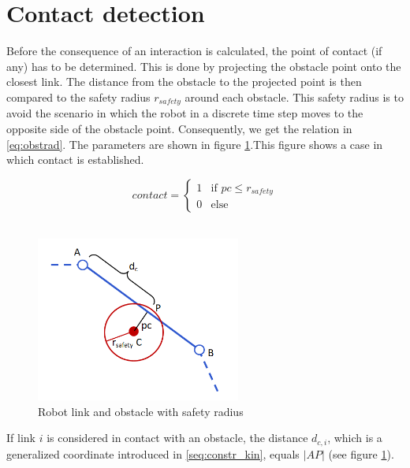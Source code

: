 \section{Contact detection}

Before the consequence of an interaction is calculated, the point of contact (if any) has to be determined. This is done by projecting the obstacle point onto the closest link. The distance from the obstacle to the projected point is then compared to the safety radius $r_{safety}$ around each obstacle. This safety radius is to avoid the scenario in which the robot in a discrete time step moves to the opposite side of the obstacle point. Consequently, we get the relation in \ref{eq:obstrad}. The parameters are shown in figure \ref{fig:obstrad}.This figure shows a case in which contact is established.

\begin{equation}\label{eq:obstrad}
    contact =
    \begin{cases}
        1 & \text{if $pc \leq r_{safety}$}\\
        0 & \text{else}
    \end{cases}
\end{equation}
\\
\begin{figure}
    \centering
    \includegraphics[width=0.6\textwidth]{figures/obst_radius.PNG}
    \caption{Robot link and obstacle with safety radius}
    \label{fig:obstrad}
\end{figure}
If link $i$ is considered in contact with an obstacle, the distance $d_{c,i}$, which is a generalized coordinate introduced in \ref{seq:constr_kin}, equals $|AP|$ (see figure \ref{fig:obstrad}).


